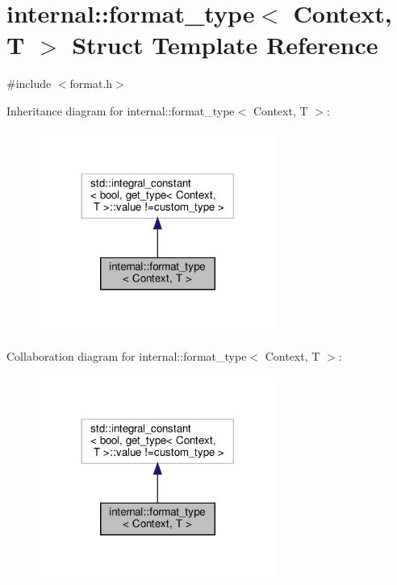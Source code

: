 \hypertarget{structinternal_1_1format__type}{}\section{internal\+:\+:format\+\_\+type$<$ Context, T $>$ Struct Template Reference}
\label{structinternal_1_1format__type}


{\ttfamily \#include $<$format.\+h$>$}



Inheritance diagram for internal\+:\+:format\+\_\+type$<$ Context, T $>$\+:
\nopagebreak
\begin{figure}[H]
\begin{center}
\leavevmode
\includegraphics[width=221pt]{structinternal_1_1format__type__inherit__graph}
\end{center}
\end{figure}


Collaboration diagram for internal\+:\+:format\+\_\+type$<$ Context, T $>$\+:
\nopagebreak
\begin{figure}[H]
\begin{center}
\leavevmode
\includegraphics[width=221pt]{structinternal_1_1format__type__coll__graph}
\end{center}
\end{figure}


